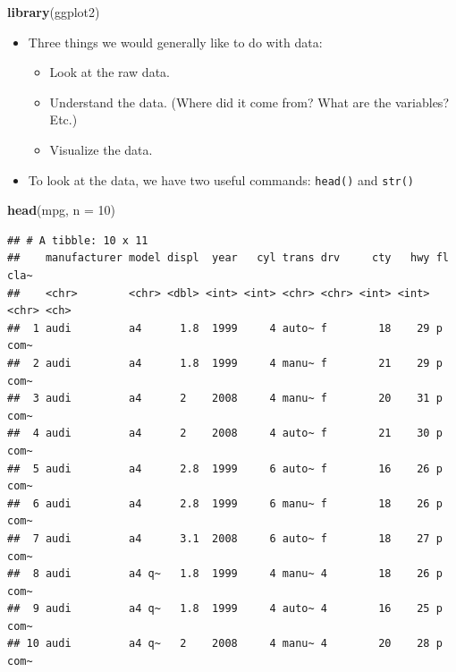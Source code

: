 \documentclass[]{book}
\newenvironment{Shaded}{\begin{snugshade}}{\end{snugshade}}
\newcommand{\KeywordTok}[1]{\textcolor[rgb]{0.13,0.29,0.53}{\textbf{#1}}}
\newcommand{\DataTypeTok}[1]{\textcolor[rgb]{0.13,0.29,0.53}{#1}}
\newcommand{\DecValTok}[1]{\textcolor[rgb]{0.00,0.00,0.81}{#1}}
\newcommand{\NormalTok}[1]{#1}
\providecommand{\tightlist}{%
  \setlength{\itemsep}{0pt}\setlength{\parskip}{0pt}}
\begin{document}
\begin{Shaded}
\begin{Highlighting}[]
\KeywordTok{library}\NormalTok{(ggplot2)}
\end{Highlighting}
\end{Shaded}

\begin{itemize}
\tightlist
\item
  Three things we would generally like to do with data:

  \begin{itemize}
  \tightlist
  \item
    Look at the raw data.
  \item
    Understand the data. (Where did it come from? What are the
    variables? Etc.)
  \item
    Visualize the data.
  \end{itemize}
\item
  To look at the data, we have two useful commands: \texttt{head()} and
  \texttt{str()}
\end{itemize}

\begin{Shaded}
\begin{Highlighting}[]
\KeywordTok{head}\NormalTok{(mpg, }\DataTypeTok{n =} \DecValTok{10}\NormalTok{)}
\end{Highlighting}
\end{Shaded}

\begin{verbatim}
## # A tibble: 10 x 11
##    manufacturer model displ  year   cyl trans drv     cty   hwy fl    cla~
##    <chr>        <chr> <dbl> <int> <int> <chr> <chr> <int> <int> <chr> <ch>
##  1 audi         a4      1.8  1999     4 auto~ f        18    29 p     com~
##  2 audi         a4      1.8  1999     4 manu~ f        21    29 p     com~
##  3 audi         a4      2    2008     4 manu~ f        20    31 p     com~
##  4 audi         a4      2    2008     4 auto~ f        21    30 p     com~
##  5 audi         a4      2.8  1999     6 auto~ f        16    26 p     com~
##  6 audi         a4      2.8  1999     6 manu~ f        18    26 p     com~
##  7 audi         a4      3.1  2008     6 auto~ f        18    27 p     com~
##  8 audi         a4 q~   1.8  1999     4 manu~ 4        18    26 p     com~
##  9 audi         a4 q~   1.8  1999     4 auto~ 4        16    25 p     com~
## 10 audi         a4 q~   2    2008     4 manu~ 4        20    28 p     com~
\end{verbatim}
\end{document}

